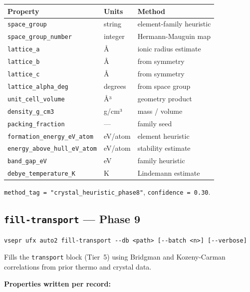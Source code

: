 \documentclass[11pt,letterpaper]{article}
\begin{document}
\begin{center}
\begin{tabular}{lll}
\toprule
Property & Units & Method \\
\midrule
\texttt{space\_group}             & string  & element-family heuristic \\
\texttt{space\_group\_number}     & integer & Hermann-Mauguin map \\
\texttt{lattice\_a}               & Å       & ionic radius estimate \\
\texttt{lattice\_b}               & Å       & from symmetry \\
\texttt{lattice\_c}               & Å       & from symmetry \\
\texttt{lattice\_alpha\_deg}      & degrees & from space group \\
\texttt{unit\_cell\_volume}       & Å³      & geometry product \\
\texttt{density\_g\_cm3}         & g/cm³   & mass / volume \\
\texttt{packing\_fraction}        & ---     & family seed \\
\texttt{formation\_energy\_eV\_atom} & eV/atom & element heuristic \\
\texttt{energy\_above\_hull\_eV\_atom} & eV/atom & stability estimate \\
\texttt{band\_gap\_eV}           & eV      & family heuristic \\
\texttt{debye\_temperature\_K}   & K       & Lindemann estimate \\
\bottomrule
\end{tabular}
\end{center}

\texttt{method\_tag = "crystal\_heuristic\_phase8"}, \texttt{confidence = 0.30}.

\subsection{\texttt{fill-transport} --- Phase 9}

\begin{lstlisting}
vsepr ufx auto2 fill-transport --db <path> [--batch <n>] [--verbose]
\end{lstlisting}

Fills the \texttt{transport} block (Tier~5) using Bridgman and
Kozeny-Carman correlations from prior thermo and crystal data.

\textbf{Properties written per record:}
\end{document}
